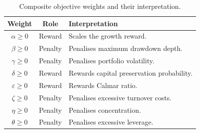 \documentclass[12pt,openany]{book}
\numberwithin{equation}{chapter}
\theoremstyle{plain}
\theoremstyle{definition}
\theoremstyle{remark}
\numberwithin{equation}{chapter}
\theoremstyle{plain}
\begin{document}
\begin{table}[H]
\centering
\caption{Composite objective weights and their interpretation.}
\label{tab:objective-weights}
\small
\begin{tabularx}{\linewidth}{@{} c c X @{}}
\toprule
\textbf{Weight} & \textbf{Role} & \textbf{Interpretation} \\
\midrule
$\alpha \geq 0$ & Reward  & Scales the growth reward. \\
$\beta \geq 0$  & Penalty & Penalises maximum drawdown depth. \\
$\gamma \geq 0$ & Penalty & Penalises portfolio volatility. \\
$\delta \geq 0$ & Reward  & Rewards capital preservation probability. \\
$\varepsilon \geq 0$ & Reward & Rewards Calmar ratio. \\
$\zeta \geq 0$  & Penalty & Penalises excessive turnover costs. \\
$\eta \geq 0$   & Penalty & Penalises concentration. \\
$\theta \geq 0$ & Penalty & Penalises excessive leverage. \\
\bottomrule
\end{tabularx}
\end{table}
\end{document}

